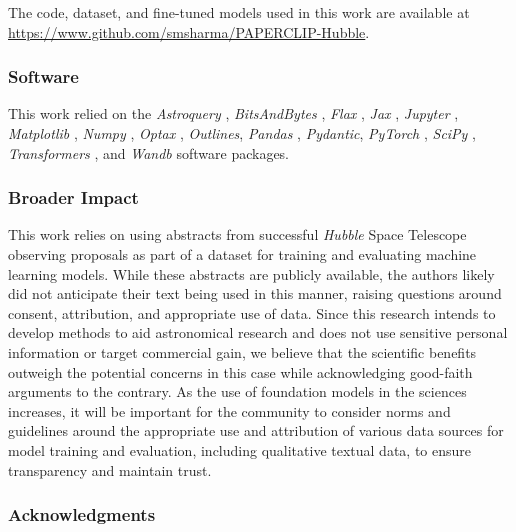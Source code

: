 \documentclass[10pt]{article} %
\newcommand{\package}[1]{\textsl{#1}\xspace}
\newcommand{\hubble}{\emph{Hubble}\xspace}
\begin{document}
The code, dataset, and fine-tuned models used in this work are available at \url{https://www.github.com/smsharma/PAPERCLIP-Hubble}.

\subsubsection*{Software}

This work relied on the \package{Astroquery} \citep{2019AJ....157...98G}, \package{BitsAndBytes} \citep{dettmers2022llmint8}, \package{Flax} \citep{flax2020github}, \package{Jax} \citep{jax2018github}, \package{Jupyter} \citep{Kluyver2016jupyter}, \package{Matplotlib} \citep{Hunter:2007}, \package{Numpy} \citep{harris2020array}, \package{Optax} \citep{deepmind2020jax}, \package{Outlines}, \package{Pandas} \citep{2020SciPy-NMeth}, \package{Pydantic}, \package{PyTorch} \citep{paszke2019pytorch}, \package{SciPy} \citep{2020SciPy-NMeth}, \package{Transformers} \citep{wolf2019huggingface}, and \package{Wandb} \citep{wandb} software packages.


\subsubsection*{Broader Impact}

This work relies on using abstracts from successful \hubble Space Telescope observing proposals as part of a dataset for training and evaluating machine learning models. While these abstracts are publicly available, the authors likely did not anticipate their text being used in this manner, raising questions around consent, attribution, and appropriate use of data. Since this research intends to develop methods to aid astronomical research and does not use sensitive personal information or target commercial gain, we believe that the scientific benefits outweigh the potential concerns in this case while acknowledging good-faith arguments to the contrary. As the use of foundation models in the sciences increases, it will be important for the community to consider norms and guidelines around the appropriate use and attribution of various data sources for model training and evaluation, including qualitative textual data, to ensure transparency and maintain trust.

\subsubsection*{Acknowledgments}
\end{document}
